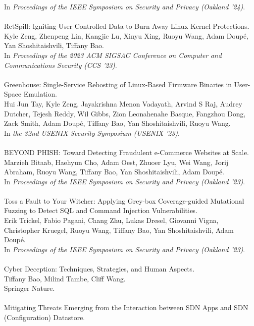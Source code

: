 In \emph{Proceedings of the IEEE Symposium on Security and Privacy (Oakland '24)}.
\\\\
RetSpill: Igniting User-Controlled Data to Burn Away Linux Kernel Protections. \\
Kyle Zeng, Zhenpeng Lin, Kangjie Lu, Xinyu Xing, Ruoyu Wang, Adam Doup\'{e}, Yan Shoshitaishvili, Tiffany Bao. \\
In \emph{Proceedings of the 2023 ACM SIGSAC Conference on Computer and Communications Security (CCS '23)}.
\\\\
Greenhouse: Single-Service Rehosting of Linux-Based Firmware Binaries in User-Space Emulation. \\
Hui Jun Tay, Kyle Zeng, Jayakrishna Menon Vadayath, Arvind S Raj, Audrey Dutcher, Tejesh Reddy, Wil Gibbs, Zion Leonahenahe Basque, Fangzhou Dong, Zack Smith, Adam Doup\'{e}, Tiffany Bao, Yan Shoshitaishvili, Ruoyu Wang. \\
In \emph{the 32nd USENIX Security Symposium (USENIX '23)}.
\\\\
BEYOND PHISH: Toward Detecting Fraudulent e-Commerce Websites at Scale. \\
Marzieh Bitaab, Haehyun Cho, Adam Oest, Zhuoer Lyu, Wei Wang, Jorij Abraham, Ruoyu Wang, Tiffany Bao, Yan Shoshitaishvili, Adam Doup\'{e}. \\
In \emph{Proceedings of the IEEE Symposium on Security and Privacy (Oakland '23)}.
\\\\
Toss a Fault to Your Witcher: Applying Grey-box Coverage-guided Mutational Fuzzing to Detect SQL and Command Injection Vulnerabilities. \\
Erik Trickel, Fabio Pagani, Chang Zhu, Lukas Dresel, Giovanni Vigna, Christopher Kruegel, Ruoyu Wang, Tiffany Bao, Yan Shoshitaishvili, Adam Doup\'{e}. \\
In \emph{Proceedings of the IEEE Symposium on Security and Privacy (Oakland '23)}.
\\\\
Cyber Deception: Techniques, Strategies, and Human Aspects.\\
Tiffany Bao, Milind Tambe, Cliff Wang.\\
Springer Nature.
\\\\
Mitigating Threats Emerging from the Interaction between SDN Apps and SDN (Configuration) Datastore. \\
